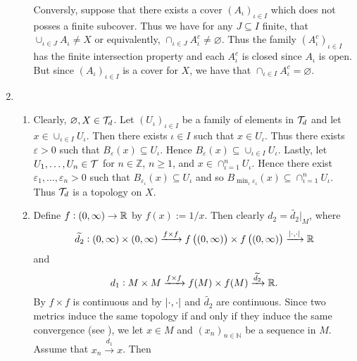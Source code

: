 \begin{enumerate}[label = \textbf{Exercise \arabic*.},wide = 0pt, itemsep=1.5ex]
\begin{enumerate}[label = \alph*),wide = 0pt, itemsep=1.5ex]
		Conversly, suppose that there exists a cover $(A_\iota)_{\iota \in I}$ which does not posses a finite subcover. Thus we have for any $J \subseteq I$ finite, that $\cup_{\iota \in J} A_\iota \neq X$ or equivalently, $\cap_{\iota \in J} A^c_\iota \neq \varnothing$. Thus the family $(A^c_\iota)_{\iota \in I}$ has the finite intersection property and each $A_\iota^c$ is closed since $A_\iota$ is open. But since $(A_\iota)_{\iota \in I}$ is a cover for $X$, we have that $\cap_{\iota \in I} A^c_\iota = \varnothing$.
	\end{enumerate}
\item
	~
	\begin{enumerate}[label = \alph*),wide = 0pt, itemsep=1.5ex]
		\item Clearly, $\varnothing,X \in \mathcal{T}_d$. Let $(U_\iota)_{\iota \in I}$ be a family of elements in $\mathcal{T}_d$ and let $x \in \cup_{\iota \in I}U_\iota$. Then there exists $\iota \in I$ such that $x \in U_\iota$. Thus there exists $\varepsilon > 0$ such that $B_\varepsilon(x) \subseteq U_\iota$. Hence $B_\varepsilon(x) \subseteq \cup_{\iota \in I} U_\iota$. Lastly, let $U_1,\dots,U_n \in \mathcal{T}$ for $n\in \mathbb{Z}$, $n \geq 1$, and $x \in \cap_{\iota = 1}^n U_\iota$. Hence there exist $\varepsilon_1,\dots,\varepsilon_n > 0$ such that $B_{\varepsilon_\iota}(x) \subseteq U_\iota$ and so $B_{\min_\iota \varepsilon_\iota}(x) \subseteq \cap_{\iota = 1}^n U_\iota$. Thus $\mathcal{T}_d$ is a topology on $X$. 
		\item Define $f : \intoo{0,\infty} \to \Rbb$ by $f(x) := 1/x$. Then clearly $d_2 = \widetilde{d_2}\vert_M$, where 
		\begin{equation*}
			\widetilde{d_2} : \intoo{0,\infty} \times \intoo{0,\infty} \xrightarrow{f \times f}{} f\del[1]{\intoo{0,\infty}} \times f\del[1]{\intoo{0,\infty}} \xrightarrow{\abs[0]{\cdot,\cdot}}{} \Rbb
		\end{equation*}
		\noindent and
		\begin{equation*}
			d_1 : M \times M \xrightarrow{f \times f}{} f(M) \times f(M) \xrightarrow{\widetilde{d_2}}{} \mathbb{R}.
		\end{equation*}
		\noindent By \cite[62]{lee:topological_manifolds:2011} $f \times f$ is continuous and by \cite[260]{engelking:general_topology:1989} $\abs[0]{\cdot,\cdot}$ and $\widetilde{d_2}$ are continuous. Since two metrics induce the same topology if and only if they induce the same convergence (see \cite[250]{engelking:general_topology:1989}), we let $x \in M$ and $(x_n)_{n \in \mathbb{N}}$ be a sequence in $M$. Assume that $x_n \xrightarrow{d_1}{} x$. Then 

\end{enumerate}
\end{enumerate}
